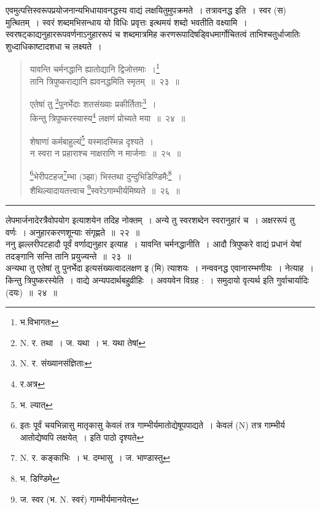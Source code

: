 \documentclass[11pt, openany]{book}
\begin{document}
एवमुत्पत्तिस्वरूपप्रयोजनान्यभिधायावनद्धस्य वाद्यं लक्षयितुमुपक्रमते~। {\qtt तत्रावनद्ध} इति~। स्वर (स) मुत्थितम्~। स्वरं शब्दमभिसन्धाय यो विधिः प्रवृत्तः इत्थमयं शब्दो भवतीति वक्ष्यामि~। स्वरषट्काद्यनुहाररूपवर्णनाऽनुहाररूपं च शब्दमात्रमिह करणरूपादिषड्विधमार्गोचितत्वं ताभिश्चतुर्धाजातिः शुध्दाधिकाष्टादशधा च लक्ष्यते~।

\newpage

\begin{quote}
{\na  यावन्ति चर्मनद्धानि ह्यातोद्यानि द्विजोत्तमाः~।\renewcommand{\thefootnote}{1}\footnote{भ.विभागतः}\\
 तानि त्रिपुष्कराद्यानि ह्यवनद्धमिति स्मृतम्~॥~२३~॥

 एतेषां तु \renewcommand{\thefootnote}{2}\footnote{N. र. तथा~। ज. यथा~। भ. यथा तेषां}पुनर्भेदाः शतसंख्याः प्रकीर्तिताः\renewcommand{\thefootnote}{3}\footnote{N. र. संख्यानसंज्ञिताः}~।\\
 किन्तु त्रिपुष्करस्यास्य\renewcommand{\thefootnote}{4}\footnote{र.अत्र} लक्षणं प्रोच्यते मया~॥~२४~॥

 शेषाणां कर्मबाहुल्यं\renewcommand{\thefootnote}{5}\footnote{भ. ल्यात्} यस्मादस्मिन्न दृश्यते~।\\
 न स्वरा न प्रहाराश्च नाक्षराणि न मार्जनाः~॥~२५~॥

 \renewcommand{\thefootnote}{6}\footnote{इतः पूर्वं चयभिन्नासु मातृकासु केवलं तत्र गाम्भीर्यमातोद्येषूपपाद्यते~। केवलं (N) तत्र गाम्भीर्य आतोद्येष्वपि लक्षयेत्~। इति पाठो दृश्यते}भेरीपटहज\renewcommand{\thefootnote}{7}\footnote{N. र. कङ्काभिः~। भ. दम्भासु~। ज. भाण्डास्तु}म्भा (ञ्झा) भिस्तथा दुन्दुभिडिण्डिमैः\renewcommand{\thefootnote}{8}\footnote{भ. डिण्डिमे}~।\\
 शैथिल्यादायतत्त्वाच \renewcommand{\thefootnote}{9}\footnote{ज. स्वर (भ. N. स्वरं) गाम्भीर्यमानयेत्}स्वरेऽगाम्भीर्यमिष्यते~॥~२६~॥}
\end{quote}

\hrule

\vspace{2mm}
लेपमार्जनादेरत्रैवोपयोग इत्याशयेन तदिह नोक्तम्~। अन्ये तु स्वरशब्देन स्वरानुहारं च~। अक्षररूपं तु वर्णः~। अनुहारकरणशून्याः संगृह्णते~॥~२२~॥\\

ननु झल्लरीपटहादौ पूर्वं वर्णाद्यनुहार इत्याह~। यावन्ति {\qtt चर्मनद्धानीति}~। आदौ त्रिपुष्करे वाद्यं प्रधानं येषां तदङ्गानि सन्ति तानि प्रयुज्यन्ते~॥~२३~॥\\

अन्यथा तु एतेषां तु पुनर्भेदा इत्यसंख्यत्वादलक्षण इ (मि) त्याशयः~। नन्ववनद्ध एवानारम्भणीयः~। {\qtt नेत्याह}~। किन्तु त्रिपुष्करस्येति~। वाद्ये {\qtt अन्यपदार्थबहु्व्रीहिः}~। अवयवेन विग्रह :~। समुदायो वृत्यर्थ इति  गुर्वाचार्यादिः (दयः)~॥~२४~॥\\
\end{document}
